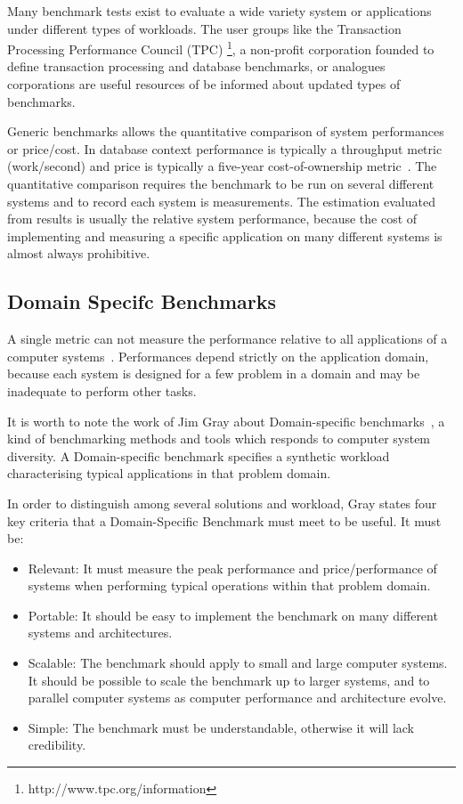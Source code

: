 Many benchmark tests exist to evaluate a wide variety system or applications under different types of workloads. The user groups like the Transaction Processing Performance Council (TPC) \footnote{http://www.tpc.org/information}, a non-profit corporation founded to define transaction processing and database benchmarks, or analogues corporations are useful resources of be informed about updated types of benchmarks. 

Generic benchmarks allows the quantitative comparison of system performances or price/cost. In database context performance is typically a throughput metric (work/second) and price is typically a five-year cost-of-ownership metric~\cite{DBLP:books/mk/Gray93}. The quantitative comparison requires the benchmark to be run on several different systems and to record each system is measurements.  The estimation evaluated from results is usually the relative system performance, because the cost of implementing and measuring a specific application on many different systems is almost always prohibitive.

\subsection{Domain Specifc Benchmarks}  \label{sec:tcp}

A single metric can not measure the performance relative to all applications of a computer systems~\cite{DBLP:books/mk/Gray93}. Performances depend strictly on the application domain, because each system is designed for a few problem in a domain and may be inadequate to perform other tasks.

It is worth to note the work of Jim Gray about Domain-specific benchmarks~\cite{DBLP:books/mk/Gray93}, a kind of benchmarking methods and tools  which responds to computer system diversity. A Domain-specific benchmark specifies a synthetic workload characterising typical applications in that problem domain. 

In order to distinguish among several solutions and workload, Gray states four key criteria that a Domain-Specific Benchmark must meet to be useful. It must be:
\begin{itemize}
\item Relevant: It must measure the peak performance and price/performance of systems when performing typical operations within that problem domain.
\item Portable: It should be easy to implement the benchmark on many different systems and architectures.
\item Scalable: The benchmark should apply to small and large computer systems. It should be possible to scale the benchmark up to larger systems, and to parallel computer systems as computer performance and architecture evolve.
\item Simple: The benchmark must be understandable, otherwise it will lack credibility.
\end{itemize} 

